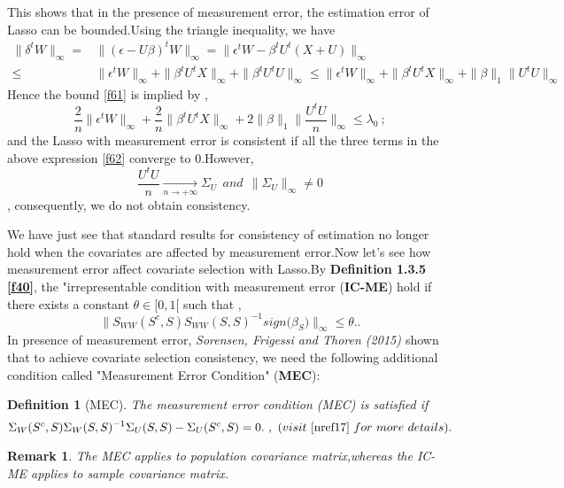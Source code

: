 \documentclass[12pt]{report}
\newtheorem {definition}{Definition}[section] %
\newtheorem{remarque}{Remark}[section]
\begin{document}
This shows that in the presence of measurement error, the estimation error of Lasso can be bounded.Using the triangle inequality, we have 
\begin{align*}
	\parallel\delta^{t}W\parallel_{\infty}=&	\parallel(\epsilon-U\beta)^{t}W\parallel_{\infty}=\parallel \epsilon^{t}W-\beta^{t}U^{t}(X+U)\parallel_{\infty}\\
	\leq&\parallel \epsilon^{t}W\parallel_{\infty}+\parallel\beta^{t}U^{t}X\parallel_{\infty}+\parallel\beta^{t}U^{t}U\parallel_{\infty}\leq\parallel \epsilon^{t}W\parallel_{\infty}+\parallel\beta^{t}U^{t}X\parallel_{\infty}+\parallel\beta\parallel_{1}\parallel U^{t}U\parallel_{\infty}
\end{align*}
Hence the bound \eqref{f61} is implied by ,
\begin{equation}
	\frac{2}{n}\parallel \epsilon^{t}W\parallel_{\infty}+\frac{2}{n}\parallel\beta^{t}U^{t}X\parallel_{\infty}+2\parallel\beta\parallel_{1}\parallel \frac{U^{t}U}{n}\parallel_{\infty}\leq\lambda_{0}\ ;
	\label{f62}
\end{equation}
and the Lasso with measurement error is consistent if all the three terms in the above expression \eqref{f62} converge to $0$.However, 
$$\frac{U^{t}U}{n}\underset{n \rightarrow +\infty}{\longrightarrow}\Sigma_{U}\ \ and\ \ \parallel\Sigma_{U}\parallel_{\infty} \neq0$$,
consequently, we do not obtain consistency.

We have just see that standard results for consistency of estimation no longer hold when the covariates are affected by measurement error.Now let's see how measurement error affect covariate selection with Lasso.By \textbf{Definition 1.3.5 \eqref{f40}}, the "irrepresentable condition with measurement error (\textbf{IC-ME}) hold if there exists a constant $\theta \in [0,1[$ such that ,
\begin{equation}
	\parallel S_{WW}(S^{c},S)S_{WW}(S,S)^{-1}sign\big(\beta_{S}\big)\parallel_{\infty}\leq \theta.
	\label{f63}.
\end{equation}
In presence of measurement error, \textit{Sorensen, Frigessi and Thoren (2015) \cite{nref17}} shown that to achieve covariate selection consistency, we need the following additional condition called "Measurement Error Condition" (\textbf{MEC}):
\begin{definition}[MEC]
	The measurement error condition (MEC) is satisfied if
	\begin{equation}
		\Sigma_{W}(S^{c},S)\Sigma_{W}(S,S)^{-1}\Sigma_{U}(S,S)-\Sigma_{U}(S^{c},S)=0.\ ,\ (visit\ \cite{nref17}\ for\ more\ details).
	\end{equation}
\end{definition}
\begin{remarque}
	The MEC applies to population covariance matrix,whereas the IC-ME applies to sample covariance matrix.
\end{remarque}
\end{document}
